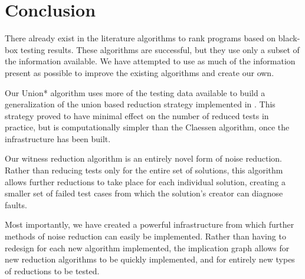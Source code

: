 \documentclass[11pt,twoside]{article}
\let\cite=\citep
\begin{document}
\section{Conclusion}
There already exist in the literature algorithms to rank programs based on black-box testing results. These algorithms are successful, but they use only a subset of the information available. We have attempted to use as much of the information present as possible to improve the existing algorithms and create our own.

Our Union* algorithm uses more of the testing data available to build a generalization of the union based reduction strategy implemented in \cite{Claessen}. This strategy proved to have minimal effect on the number of reduced tests in practice, but is computationally simpler than the Claessen algorithm, once the infrastructure has been built.

Our witness reduction algorithm is an entirely novel form of noise reduction. Rather than reducing tests only for the entire set of solutions, this algorithm allows further reductions to take place for each individual solution, creating a smaller set of failed test cases from which the solution's creator can diagnose faults.

Most importantly, we have created a powerful infrastructure from which further methods of noise reduction can easily be implemented. Rather than having to redesign for each new algorithm implemented, the implication graph allows for new reduction algorithms to be quickly implemented, and for entirely new types of reductions to be tested.



\end{document}

